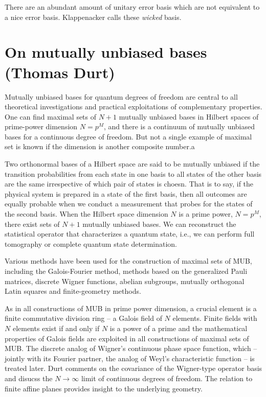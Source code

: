 \documentclass[a4paper]{article}
\begin{document}
  There are an abundant amount of unitary error basis which
  are not equivalent to a nice error basis. Klappenacker
  calls these \textit{wicked} basis.

  \section{On mutually unbiased bases (Thomas Durt)}

  Mutually unbiased bases for quantum degrees of freedom are
  central to all theoretical investigations and practical
  exploitations of complementary properties. One can find
  maximal sets of $N+1$ mutually unbiased bases in Hilbert
  spaces of prime-power dimension $N = p^{M}$, and there is
  a continuum of mutually unbiased bases for a continuous
  degree of freedom. But not a single example of maximal set
  is known if the dimension is another composite number.a

  Two orthonormal bases of a Hilbert space are said to be
  mutually unbiased if the transition probabilities from
  each state in one basis to all states of the other basis
  are the same irrespective of which pair of states is
  choesn. That is to say, if the physical system is prepared
  in a state of the first basis, then all outcomes are
  equally probable when we conduct a measurement that probes
  for the states of the second basis. When the Hilbert space
  dimension $N$ is a prime power, $N = p^{M}$, there exist
  sets of $N+1$ mutually unbiased bases. We can reconstruct
  the statistical operator that characterizes a quantum
  state, i.e., we can perform full tomography or complete
  quantum state determination.

  Various methods have been used for the construction of
  maximal sets of MUB, including the Galois-Fourier method,
  methods based on the generalized Pauli matrices, discrete
  Wigner functions, abelian subgroups, mutually orthogonal
  Latin squares and finite-geometry methods.

  As in all constructions of MUB in prime power dimension, a
  crucial element is a finite commutative division ring -- a
  Galois field of $N$ elements. Finite fields with $N$ 
  elements exist if and only if $N$ is a power of a prime
  and the mathematical properties of Galois fields are
  exploited in all constructions of maximal sets of MUB. The
  discrete analog of Wigner's continuous phase space
  function, which -- jointly with its Fourier partner, the
  analog of Weyl's characteristic function -- is treated
  later. Durt comments on the covariance of the Wigner-type
  operator basis and disucss the $N \to \infty$ limit of
  continuous degrees of freedom. The relation to finite
  affine planes provides insight to the underlying geometry.
\end{document}
